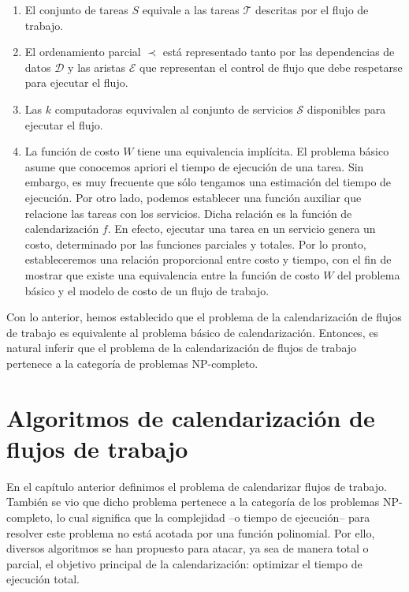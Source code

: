\documentclass[letterpaper, 12pt]{report}
\begin{document}
\begin{enumerate}
\item El conjunto de tareas $S$ equivale a las tareas $\mathcal{T}$ descritas por el flujo de trabajo.

\item El ordenamiento parcial $\prec$ está representado tanto por las dependencias de datos $\mathcal{D}$ y las aristas $\mathcal{E}$ que representan el control de flujo que debe respetarse para ejecutar el flujo.

\item Las $k$ computadoras equvivalen al conjunto de servicios $\mathcal{S}$ disponibles para ejecutar el flujo.

\item La función de costo $W$ tiene una equivalencia implícita. El problema básico asume que conocemos apriori el tiempo de ejecución de una tarea. Sin embargo, es muy frecuente que sólo tengamos una estimación del tiempo de ejecución. Por otro lado, podemos establecer una función auxiliar que relacione las tareas con los servicios. Dicha relación es la función de calendarización $f$. En efecto, ejecutar una tarea en un servicio genera un costo, determinado por las funciones parciales y totales. Por lo pronto, estableceremos una relación proporcional entre costo y tiempo, con el fin de mostrar que existe una equivalencia entre la función de costo $W$ del problema básico y el modelo de costo de un flujo de trabajo.
\end{enumerate}

Con lo anterior, hemos establecido que el problema de la calendarización de flujos de trabajo es equivalente al problema básico de calendarización. Entonces, es natural inferir que el problema de la calendarización de flujos de trabajo pertenece a la categoría de problemas NP-completo.


\chapter{Algoritmos de calendarización de flujos de trabajo}
En el capítulo anterior definimos el problema de calendarizar flujos de trabajo. También se vio que dicho problema pertenece a la categoría de los problemas NP-completo, lo cual significa que la complejidad --o tiempo de ejecución-- para resolver este problema no está acotada por una función polinomial. Por ello, diversos algoritmos se han propuesto para atacar, ya sea de manera total o parcial, el objetivo principal de la calendarización: optimizar el tiempo de ejecución total.
\end{document}

